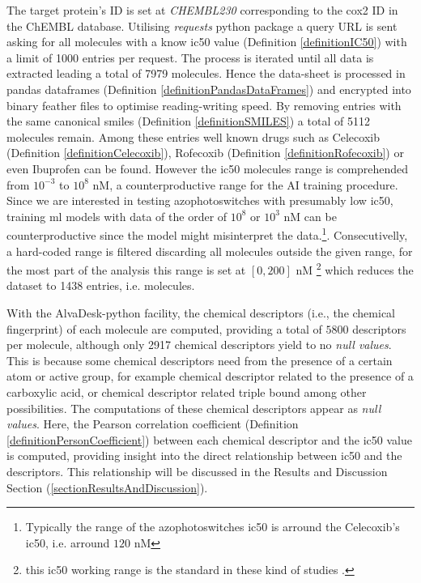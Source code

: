 \documentclass[11pt]{article}
\begin{document}
The target protein's ID is set at \emph{CHEMBL230} corresponding to the \gls{cox2} ID in the ChEMBL database\cite{ChemblDatabase}. Utilising \emph{requests} python package\cite{PythonPackageRequests} a query URL is sent asking for all molecules with a know \gls{ic50} value (Definition \ref{definitionIC50}) with a limit of 1000 entries per request. The process is iterated until all data is extracted leading a total of 7979 molecules. Hence the data-sheet is processed in pandas dataframes \cite{PythonPackagePandas} (Definition \ref{definitionPandasDataFrames}) and encrypted into binary feather files to optimise reading-writing speed. By removing entries with the same canonical \gls{smiles} (Definition \ref{definitionSMILES})  a total of 5112 molecules remain. Among these entries well known drugs such as Celecoxib (Definition \ref{definitionCelecoxib}), Rofecoxib (Definition \ref{definitionRofecoxib}) or even Ibuprofen can be found. However the \gls{ic50} molecules range is comprehended from $10^{-3}$ to $10^{8}$ nM, a counterproductive range for the AI training procedure. Since we are interested in testing azophotoswitches with presumably low \gls{ic50}, training \gls{ml} models with data of the order of $10^{8}$ or $10^{3}$ nM can be counterproductive since the model might misinterpret the data.\footnote{Typically the range of the azophotoswitches \gls{ic50} is arround the Celecoxib's \gls{ic50}, i.e. arround $120$ nM}. Consecutivelly, a hard-coded range is filtered discarding all molecules outside the given range, for the most part of the analysis this range is set at $[0,200]$ nM \footnote{this \gls{ic50} working range is the standard in these kind of studies \cite{MachineLearningPaper5Lipoxygenase}.} which reduces the dataset to 1438 entries, i.e. molecules.

With the AlvaDesk-python \cite{AlvaDescSecondPaper} facility, the chemical descriptors (i.e., the chemical fingerprint) of each molecule are computed, providing a total of $5800$ descriptors per molecule, although only 2917 chemical descriptors yield to no \emph{null values}. This is because some chemical descriptors need from the presence of a certain atom or active group, for example chemical descriptor related to the presence of a carboxylic acid, or chemical descriptor related triple bound among other possibilities. The computations of these chemical descriptors appear as \emph{null values}. Here, the Pearson correlation coefficient (Definition \ref{definitionPersonCoefficient}) between each chemical descriptor and the \gls{ic50} value is computed, providing insight into the direct relationship between \gls{ic50} and the descriptors. This relationship will be discussed in the Results and Discussion Section (\ref{sectionResultsAndDiscussion}).
\end{document}
